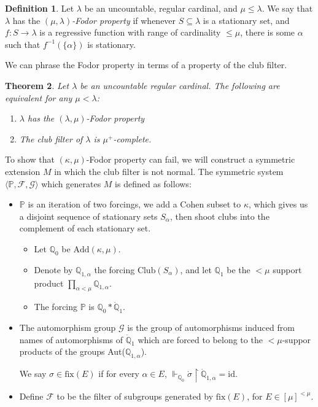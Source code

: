 \documentclass[a4paper,11pt]{amsart}
\newtheorem{theorem}{Theorem}[section]
\theoremstyle{definition}
\newtheorem{definition}[theorem]{Definition}
\newcommand{\Q}{\mathbb{Q}} %
\newcommand{\p}{\mathbb{P}}
\begin{document}
\begin{definition}
    Let $\lambda$ be an uncountable, regular cardinal, and $\mu \leqslant \lambda$. We say that $\lambda$ has the \emph{$(\mu, \lambda)$-Fodor property} if whenever $S \subseteq \lambda$ is a stationary set, and $f: S \rightarrow \lambda$ is a regressive function with range of cardinality $\leqslant \mu$, there is some $\alpha$ such that $f^{-1}(\{ \alpha\})$ is stationary. 
\end{definition}

We can phrase the Fodor property in terms of a property of the club filter.

\begin{theorem}
    Let $\lambda$ be an uncountable regular cardinal. The following are equivalent for any $\mu < \lambda$: 
    \begin{enumerate}
        \item $\lambda$ has the $(\lambda, \mu)$-Fodor property
        \item The club filter of $\lambda$ is $\mu^+$-complete. 
    \end{enumerate}
\end{theorem}

To show that $(\kappa, \mu)$-Fodor property can fail, we will construct a symmetric extension $M$ in which the club filter is not normal. The symmetric system $\langle \p, \mathscr{F}, \mathscr{G}\rangle$ which generates $M$ is defined as follows: 

\begin{itemize}
    \item $\p$ is an iteration of two forcings, we add a Cohen subset to $\kappa$, which gives us a disjoint sequence of stationary sets $S_\alpha$, then shoot clubs into the complement of each stationary set. 
    \begin{itemize}
        \item Let $\Q_0$ be $\text{Add}(\kappa, \mu)$. 
        \item Denote by $\Q_{1,\alpha}$ the forcing $\text{Club}(S_\alpha)$, and let $\Q_1$ be the $<\mu$ support product $\prod_{\alpha<\mu} \Q_{1,\alpha}$. 
        \item The forcing $\p$ is $\Q_0 \ast \dot{\Q}_1$. 
    \end{itemize}
    
    \item The automorphism group $\mathscr{G}$ is the group of automorphisms induced from names of automorphisms of $\dot{\Q}_1$ which are forced to belong to the $<\mu$-suppor products of the groups Aut($\Q_{1,\alpha}$).  

We say $\sigma \in \text{fix}(E)$ if for every $\alpha \in E$, $\Vdash_{\Q_0} \dot{\sigma} \restriction \dot{\Q}_{1, \alpha} = \text{id}$. 

    \item Define $\mathscr{F}$ to be the filter of subgroups generated by $\text{fix}(E)$, for $E \in [\mu]^{<\mu}$.  
    
    
\end{itemize}
\end{document}
